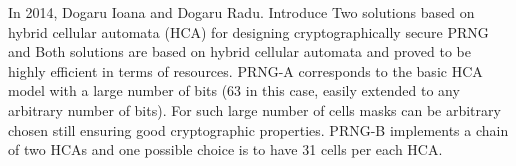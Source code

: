 In 2014, Dogaru Ioana and Dogaru Radu. Introduce Two solutions based on hybrid cellular automata (HCA) for designing cryptographically secure PRNG and Both solutions are based on hybrid cellular automata and proved to be highly efficient in terms of resources. PRNG-A corresponds to the basic HCA model with a large number of bits (63 in this case, easily extended to any arbitrary number of bits). For such large number of cells masks can be arbitrary chosen still ensuring good cryptographic properties. PRNG-B implements a chain of two HCAs and one possible choice is to have 31 cells per each HCA.